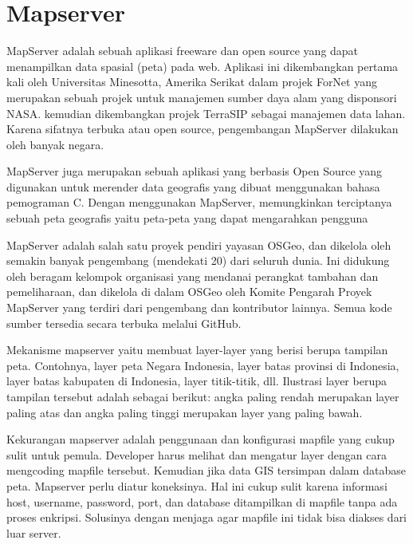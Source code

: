 \section{Mapserver}
MapServer adalah sebuah aplikasi freeware dan open source yang dapat menampilkan data spasial (peta) pada web. Aplikasi ini dikembangkan pertama kali oleh Universitas Minesotta, Amerika Serikat dalam projek ForNet yang merupakan sebuah projek untuk manajemen sumber daya alam yang disponsori NASA. kemudian dikembangkan projek TerraSIP sebagai manajemen data lahan. Karena sifatnya terbuka atau open source, pengembangan MapServer dilakukan oleh banyak negara.

 MapServer juga merupakan sebuah aplikasi yang berbasis Open Source yang digunakan untuk merender data geografis yang dibuat menggunakan bahasa pemograman C. Dengan menggunakan MapServer, memungkinkan terciptanya sebuah peta geografis yaitu peta-peta yang dapat mengarahkan pengguna

MapServer adalah salah satu proyek pendiri yayasan OSGeo, dan dikelola oleh semakin banyak pengembang (mendekati 20) dari seluruh dunia. Ini didukung oleh beragam kelompok organisasi yang mendanai perangkat tambahan dan pemeliharaan, dan dikelola di dalam OSGeo oleh Komite Pengarah Proyek MapServer yang terdiri dari pengembang dan kontributor lainnya. Semua kode sumber tersedia secara terbuka melalui GitHub.

Mekanisme mapserver yaitu membuat layer-layer yang berisi berupa tampilan peta. Contohnya, layer peta Negara Indonesia, layer batas provinsi di Indonesia, layer batas kabupaten di Indonesia, layer titik-titik, dll. Ilustrasi layer berupa tampilan tersebut adalah sebagai berikut: angka paling rendah merupakan layer paling atas dan angka paling tinggi merupakan layer yang paling bawah.

Kekurangan mapserver adalah penggunaan dan konfigurasi mapfile yang cukup sulit untuk pemula. Developer harus melihat dan mengatur layer dengan cara mengcoding mapfile tersebut. Kemudian jika data GIS tersimpan dalam database peta. Mapserver perlu diatur koneksinya. Hal ini cukup sulit karena informasi host, username, password, port, dan database ditampilkan di mapfile tanpa ada proses enkripsi. Solusinya dengan menjaga agar mapfile ini tidak bisa diakses dari luar server.


